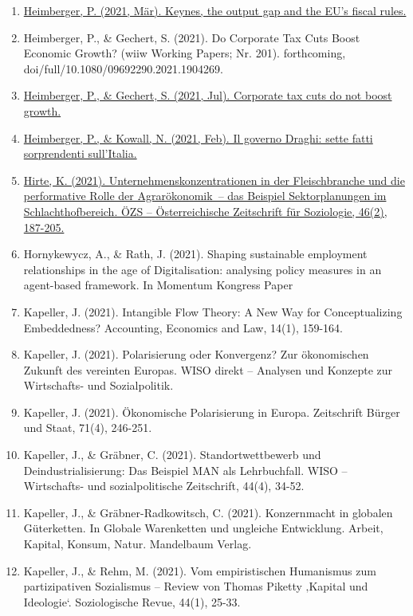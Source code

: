 \begin{enumerate}
	 \item \href{https://wiiw.ac.at/keynes-the-output-gap-and-the-eu-s-fiscal-rules-n-487.html}{Heimberger, P. (2021, Mär). Keynes, the output gap and the EU’s fiscal rules.}
	 \item Heimberger, P., \& Gechert, S. (2021). Do Corporate Tax Cuts Boost Economic Growth? (wiiw Working Papers; Nr. 201). forthcoming, doi/full/10.1080/09692290.2021.1904269.
	 \item \href{https://www.socialeurope.eu/corporate-tax-cuts-do-not-boost-growth}{Heimberger, P., \& Gechert, S. (2021, Jul). Corporate tax cuts do not boost growth.}
	 \item \href{https://formiche.net/2021/02/il-governo-draghi-sette-fatti-sorprendenti-sullitalia/}{Heimberger, P., \& Kowall, N. (2021, Feb). Il governo Draghi: sette fatti sorprendenti sull’Italia.}
	 \item \href{https://doi.org/10.1007/s11614-021-00448-x}{Hirte, K. (2021). Unternehmenskonzentrationen in der Fleischbranche und die performative Rolle der Agrarökonomik – das Beispiel Sektorplanungen im Schlachthofbereich. ÖZS -- Österreichische Zeitschrift für Soziologie, 46(2), 187-205.}
	 \item Hornykewycz, A., \& Rath, J. (2021). Shaping sustainable employment relationships in the age of Digitalisation: analysing policy measures in an agent-based framework. In Momentum Kongress Paper
	 \item Kapeller, J. (2021). Intangible Flow Theory: A New Way for Conceptualizing Embeddedness? Accounting, Economics and Law, 14(1), 159-164.
	 \item Kapeller, J. (2021). Polarisierung oder Konvergenz? Zur ökonomischen Zukunft des vereinten Europas. WISO direkt -- Analysen und Konzepte zur Wirtschafts- und Sozialpolitik.
	 \item Kapeller, J. (2021). Ökonomische Polarisierung in Europa. Zeitschrift Bürger und Staat, 71(4), 246-251.
	 \item Kapeller, J., \& Gräbner, C. (2021). Standortwettbewerb und Deindustrialisierung: Das Beispiel MAN als Lehrbuchfall. WISO -- Wirtschafts- und sozialpolitische Zeitschrift, 44(4), 34-52.
	 \item Kapeller, J., \& Gräbner-Radkowitsch, C. (2021). Konzernmacht in globalen Güterketten. In Globale Warenketten und ungleiche Entwicklung. Arbeit, Kapital, Konsum, Natur. Mandelbaum Verlag.
	 \item Kapeller, J., \& Rehm, M. (2021). Vom empiristischen Humanismus zum partizipativen Sozialismus – Review von Thomas Piketty ‚Kapital und Ideologie‘. Soziologische Revue, 44(1), 25-33.

\end{enumerate}
